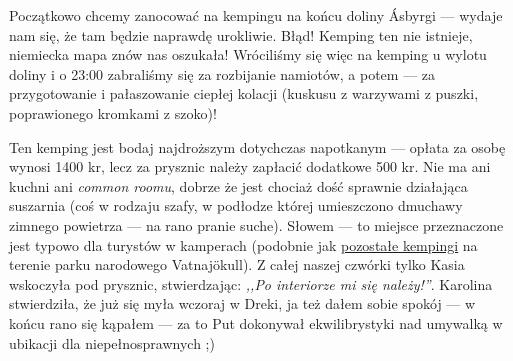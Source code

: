 
Początkowo chcemy zanocować na kempingu na końcu doliny Ásbyrgi --- wydaje nam się, że tam będzie naprawdę urokliwie. Błąd! Kemping ten nie istnieje, niemiecka mapa znów nas oszukała! Wróciliśmy się więc na kemping u wylotu doliny i o 23:00 zabraliśmy się za rozbijanie namiotów, a potem --- za przygotowanie i pałaszowanie ciepłej kolacji (kuskusu z warzywami z puszki, poprawionego kromkami z szoko)!

Ten kemping jest bodaj najdroższym dotychczas napotkanym --- opłata za osobę wynosi 1400 kr, lecz za prysznic należy zapłacić dodatkowe 500 kr. Nie ma ani kuchni ani \emph{common roomu}, dobrze że jest chociaż dość sprawnie działająca suszarnia (coś w rodzaju szafy, w podłodze której umieszczono dmuchawy zimnego powietrza --- na rano pranie suche). Słowem --- to miejsce przeznaczone jest typowo dla turystów w kamperach (podobnie jak \href{http://www.vatnajokulsthjodgardur.is/english/plan-your-visit/camping/}{pozostałe kempingi} na terenie parku narodowego Vatnajökull). Z całej naszej czwórki tylko Kasia wskoczyła pod prysznic, stwierdzając: \emph{,,Po interiorze mi się należy!''}. Karolina stwierdziła, że już się myła wczoraj  w Dreki, ja też dałem sobie spokój --- w końcu rano się kąpałem --- za to Put dokonywał ekwilibrystyki nad umywalką w ubikacji dla niepełnosprawnych ;)


